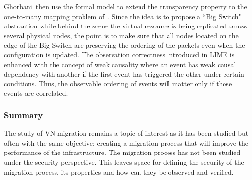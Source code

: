 Ghorbani~\etal then use the formal model to extend the transparency property to the one-to-many mapping problem of~\cite{toward-Ghorbani2014}.
Since the idea is to propose a ``Big Switch" abstraction while behind the scene the virtual resource is being replicated across several physical nodes, the point is to make sure that all nodes located on the edge of the Big Switch are preserving the ordering of the packets even when the configuration is updated.
The observation correctness introduced in LIME is enhanced with the concept of weak causality where an event has weak causal dependency with another if the first event has triggered the other under certain conditions.
Thus, the observable ordering of events will matter only if those events are correlated.

\subsubsection{Summary}
The study of VN migration remains a topic of interest as it has been studied but often with the same objective: creating a migration process that will improve the performance of the infrastructure. 
The migration process has not been studied under the security perspective.
This leaves space for defining the security of the migration process, its properties and how can they be observed and verified.